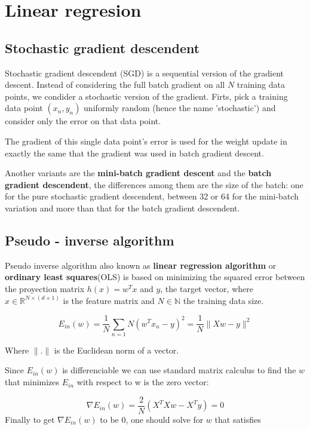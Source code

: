 
\section{ Linear regresion }
\subsection{Stochastic gradient descendent}


Stochastic gradient descendent (SGD) is a sequential version of the gradient descent. Instead of considering the full batch gradient on all $N$
training data points, we condider a stochastic version of the gradient. Firts, pick a training data point $(x_n, y_n)$ uniformly random
(hence the name 'stochastic') and consider only the error on that data point.  \cite{LFD}

The gradient of this single data point's error is used for the weight update in exactly the same that the gradient was used in batch gradient descent.

Another variants are the \textbf{mini-batch gradient descent} and the \textbf{batch gradient descendent}, the differences among them are the size of the batch: one for the pure stochastic gradient descendent, between 32 or 64 for the mini-batch variation and more than that for the batch gradient descendent.


\subsection{Pseudo - inverse algorithm}
Pseudo inverse algorithm also known as \textbf{linear regression algorithm} or \textbf{ordinary least squares}(OLS) is based on minimizing the squared error between the 
proyection matrix $h(x) = w^T x$ and $y$, the target vector, where $x \in \mathbb R^{N \times (d+1)}$ is the feature matrix and
$N \in \mathbb N$ the training data size.   

\begin{equation*}
  E_{in}(w) = \frac{1}{N} \sum_{n=1}{N} (w^T x_n - y)^2 
  = \frac{1}{N} \| Xw -y \|^2 
\end{equation*}

Where $\|.\|$ is the Euclidean norm of a vector.

Since $E_{in}(w)$ is differenciable we can use standard matrix calculus to find the $w$ that minimizes  $E_{in}$ with respect to w is the zero vector:

$$\nabla E_{in}(w) = \frac{2}{N}(X^TXw - X^T y) =0$$
Finally to get $\nabla  E_{in}(w)$ to be $0$, one should solve for $w$ that satisfies

